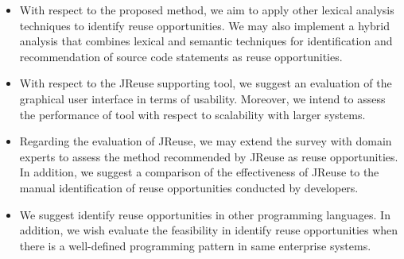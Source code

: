 \begin{itemize}
\item With respect to the proposed method, we aim to apply other lexical analysis techniques to identify reuse opportunities. We may also implement a hybrid analysis that combines lexical and semantic techniques for identification and recommendation of source code statements as reuse opportunities.

\item With respect to the JReuse supporting tool, we suggest an evaluation of the graphical user interface  in terms of usability. Moreover, we intend to assess the performance of tool with respect to scalability with larger systems.

\item Regarding the evaluation of JReuse, we may extend the survey with domain experts to assess the method recommended by JReuse as reuse opportunities. In addition, we suggest a comparison of the effectiveness of JReuse to the manual identification of reuse opportunities conducted by developers.

\item We suggest identify reuse opportunities in other programming languages. In addition, we wish evaluate the feasibility in identify reuse opportunities when there is a well-defined programming pattern  in same enterprise systems.


\end{itemize}